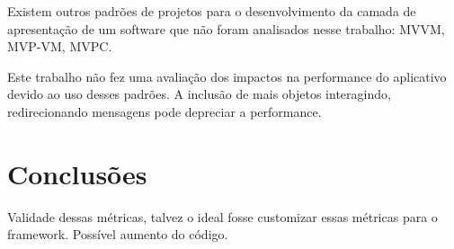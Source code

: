 \documentclass[
	12pt,				%
	openright,			%
	twoside,			%
	a4paper,			%
	english,			%
	french,				%
	spanish,			%
	brazil,				%
	]{abntex2}
\begin{document}
Existem outros padrões de projetos para o desenvolvimento da camada de
apresentação de um software que não foram analisados nesse trabalho: MVVM,
MVP-VM, MVPC.

Este trabalho não fez uma avaliação dos impactos na performance do aplicativo
devido ao uso desses padrões. A inclusão de mais objetos interagindo,
redirecionando mensagens pode depreciar a performance.


\section{Conclusões}

Validade dessas métricas, talvez o ideal fosse customizar essas métricas para o
framework.
Possível aumento do código.


% 

\postextual




%
%
\end{document}

